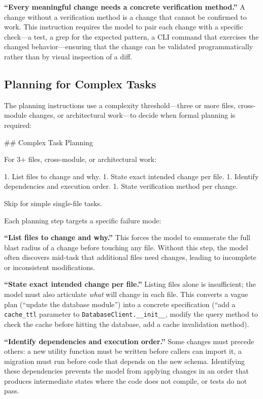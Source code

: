 \documentclass{article}
\begin{document}
\textbf{``Every meaningful change needs a concrete verification method.''}  A change without a verification method is a change that cannot be confirmed to work.  This instruction requires the model to pair each change with a specific check---a test, a grep for the expected pattern, a CLI command that exercises the changed behavior---ensuring that the change can be validated programmatically rather than by visual inspection of a diff.

\subsection{Planning for Complex Tasks}

The planning instructions use a complexity threshold---three or more files, cross-module changes, or architectural work---to decide when formal planning is required:

\begin{prompt}
## Complex Task Planning

For 3+ files, cross-module, or architectural work:

1. List files to change and why.
1. State exact intended change per file.
1. Identify dependencies and execution order.
1. State verification method per change.

Skip for simple single-file tasks.
\end{prompt}

\noindent Each planning step targets a specific failure mode:

\textbf{``List files to change and why.''}  This forces the model to enumerate the full blast radius of a change before touching any file.  Without this step, the model often discovers mid-task that additional files need changes, leading to incomplete or inconsistent modifications.

\textbf{``State exact intended change per file.''} Listing files alone is insufficient; the model must also articulate \emph{what} will change in each file.  This converts a vague plan (``update the database module'') into a concrete specification (``add a \texttt{cache\_ttl} parameter to \texttt{DatabaseClient.\_\_init\_\_}, modify the query method to check the cache before hitting the database, add a cache invalidation method).

\textbf{``Identify dependencies and execution order.''}  Some changes must precede others: a new utility function must be written before callers can import it, a migration must run before code that depends on the new schema.  Identifying these dependencies prevents the model from applying changes in an order that produces intermediate states where the code does not compile, or tests do not pass.
\end{document}
